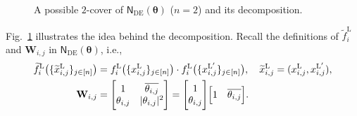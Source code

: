 \documentclass[conference]{IEEEtran}
\theoremstyle{plain}
\theoremstyle{definition}
\newcommand{\sfn}{\mathsf{N}}
\newcommand{\fl}[1]{ f^{\mathrm{L}}_{ #1 } }
\newcommand{\xl}[1]{ x^{\mathrm{L}}_{ #1 } }
\newcommand{\xlprime}[1]{ x^{\mathrm{L}'}_{ #1 } }
\newcommand{\tfl}[1]{\widetilde{f}^{\mathrm{L}}_{ #1 }}
\newcommand{\txl}[1]{\widetilde{x}^{\mathrm{L}}_{ #1 }}
\newcommand{\btheta}{\boldsymbol{\theta}}
\newcommand{\sfnDE}{\sfn_{\mathrm{DE}}}
\begin{document}
\begin{figure}[t]
\begin{minipage}[t]{0.35\linewidth}
\end{minipage}%
  \caption{A possible $2$-cover of $\sfnDE(\btheta)$ ($n=2$) and its decomposition.} \label{fig:doublecover:DENFG:decomp}
 \end{figure}

 Fig.~\ref{fig:doublecover:DENFG:decomp} illustrates the idea behind the
 decomposition. Recall the definitions of $\tfl{i}$ and $\mathbf W_{i,j}$ in
 \(\sfnDE(\btheta)\), i.e.,
 \begin{align*}
  \tfl{i}\bigl(\{\txl{i,j}\}_{j\in[n]}\bigr) & =
  \fl{i}\bigl(\{ \xl{i,j} \}_{j \in [n]}\bigr)\cdot
  \fl{i}\bigl(\{ \xlprime{i,j} \}_{j \in [n]}\bigr), \quad
  \txl{i,j} = (\xl{i,j}, \xlprime{i,j}),         \\
  \mathbf W_{i,j}                            & =
  \Biggl[\begin{matrix}
           1            & \overline{\theta_{i,j}} \\
           \theta_{i,j} & |\theta_{i,j}|^2
          \end{matrix}\Biggr] =
  \Biggl[\begin{matrix}
           1 \\ \theta_{i,j}
          \end{matrix}\Biggr]
  \Bigl[\begin{matrix}
          1 & \overline{\theta_{i,j}}
         \end{matrix}\Bigr].
 \end{align*}
\end{document}
